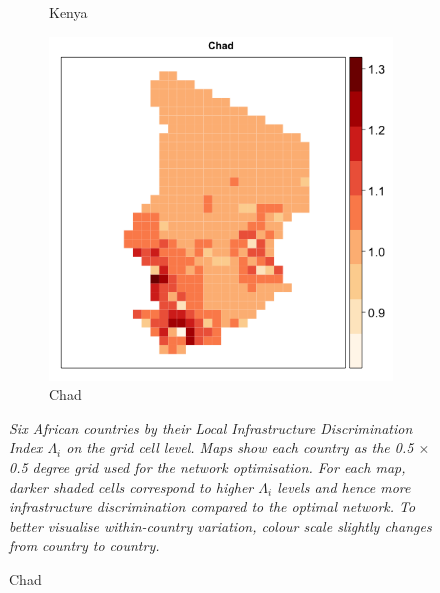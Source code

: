 \documentclass[11pt, oneside]{article}   	%
\newcommand{\mysubcaption}[1]{
\justify
\begin{spacing}{0.7}
\textit{\footnotesize #1}
\end{spacing}}
\begin{document}
\begin{figure}[t]
\begin{subfigure}[c]{0.32\textwidth}
\caption{Kenya}
\label{fig:Kenya_zeta}
\end{subfigure}
\begin{subfigure}[c]{0.32\textwidth}
\includegraphics[width=\textwidth]{../../Analysis/output/zeta_heatmaps/Chad_zeta.png}
\caption{Chad}
\label{fig:Chad_zeta}
\end{subfigure}



\label{fig:zeta_countries}
\mysubcaption{Six African countries by their Local Infrastructure Discrimination Index $\Lambda_{i}$ on the grid cell level. Maps show each country as the 0.5 $\times$ 0.5 degree grid used for the network optimisation. For each map, darker shaded cells correspond to higher $\Lambda_{i}$ levels and hence more infrastructure discrimination compared to the optimal network. To better visualise within-country variation, colour scale slightly changes from country to country.}
\end{figure}
\end{document}
